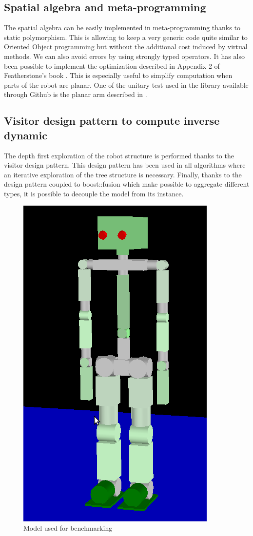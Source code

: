 \subsection{Spatial algebra and meta-programming}
The 
spatial algebra can be easily implemented in meta-programming thanks to static polymorphism.
This is allowing to keep a very generic code quite similar to Oriented Object programming 
but without the additional cost induced by virtual methods.
We can also avoid errors by using strongly typed operators.
It has also been possible to implement the optimization described in Appendix 2 of Featherstone's book 
\cite{Featherstone:RBM:2008}. This is especially useful to simplify computation when parts of
the robot are planar. One of the unitary test used in the library available through Github
is the planar arm described in \cite{Spong:RMC:2006}.

\subsection{Visitor design pattern to compute inverse dynamic}
The depth first exploration of the robot  structure is performed thanks to the visitor design pattern.
This design pattern has been used in all algorithms where an iterative exploration of the tree structure is necessary.
Finally, thanks to the design pattern coupled to boost::fusion which make possible to aggregate different types,
it is possible to decouple the model from its instance.

\begin{figure}
  \begin{center}
    \includegraphics[width=0.3\linewidth]{Annexe1/figures/SampleHumanoid.png}
  \end{center}
  \caption{Model used for benchmarking}
  \label{fig:samplehumanoid}
\end{figure}

